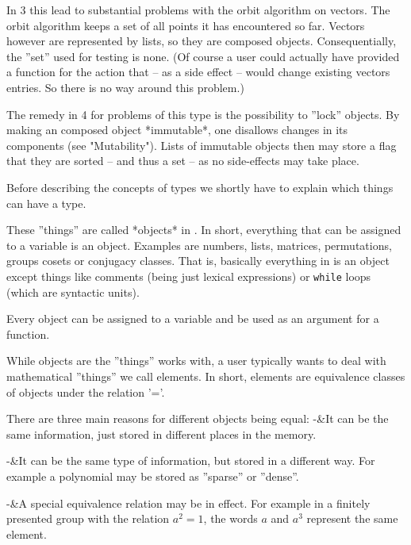 In {\GAP} 3 this lead to substantial problems with the orbit algorithm on
vectors. The orbit algorithm keeps a set of all points it has encountered so
far. Vectors however are represented by lists, so they are composed objects.
Consequentially, the ''set'' used for testing is none. (Of course a
user could actually have provided a function for the action that
-- as a side effect -- would change existing vectors entries. So there is no
way around this problem.)

The remedy in {\GAP} 4 for problems of this type is the possibility to
''lock'' objects. By making an composed object *immutable*, one disallows
changes in its components (see "Mutability"). Lists of immutable objects
then may store a flag that they are sorted -- and thus a set -- as no
side-effects may take place.



Before describing the concepts of types we shortly have to explain which
things can have a type.

These ''things'' are called *objects* in {\GAP}. In short, everything that
can be assigned to a variable is an object. Examples are numbers, lists,
matrices, permutations, groups cosets or conjugacy classes. That is,
basically everything in {\GAP} is an object except things like comments (being
just lexical expressions) or {\tt while} loops (which are syntactic units).

Every object can be assigned to a variable and be used as an argument for a
function.


While objects are the ''things'' {\GAP} works with, a user typically wants to
deal with mathematical ''things'' we call elements. In short, elements are
equivalence classes of objects under the relation '='.

There are three main reasons for different objects being equal:
\beginitems
-&It can be the same information, just stored in different places
in the memory.

-&It can be the same type of information, but stored in a different way.
For example a polynomial may be stored as ''sparse'' or ''dense''.

-&A special equivalence relation may be in effect. For example in a
finitely presented group with the relation $a^2=1$, the words $a$ and
$a^3$ represent the same element.

\enditems

